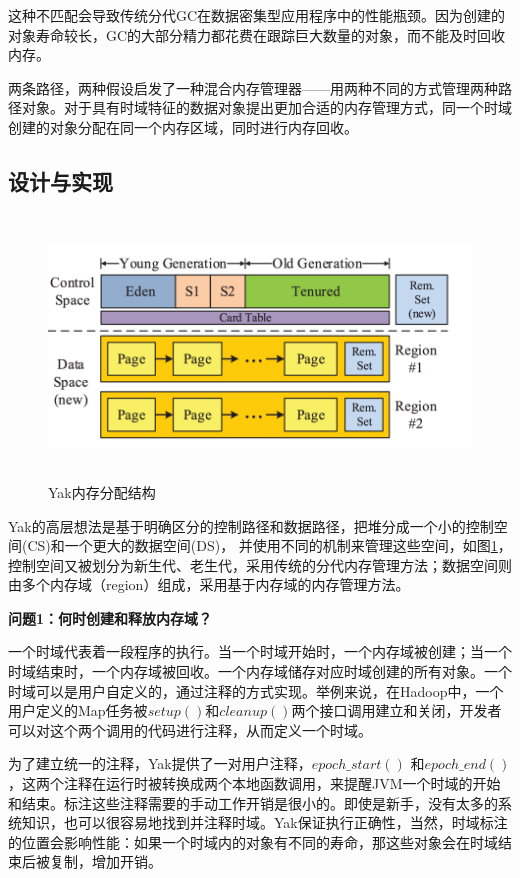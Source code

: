 这种不匹配会导致传统分代GC在数据密集型应用程序中的性能瓶颈。因为创建的对象寿命较长，GC的大部分精力都花费在跟踪巨大数量的对象，而不能及时回收内存。 

两条路径，两种假设启发了一种混合内存管理器——用两种不同的方式管理两种路径对象。对于具有时域特征的数据对象提出更加合适的内存管理方式，同一个时域创建的对象分配在同一个内存区域，同时进行内存回收。

\subsection{设计与实现}
\begin{figure}[h]
    \centering
    \includegraphics[width=12cm,height=7cm]{figure/layout.png}
    \caption{
       Yak内存分配结构
    }
    \label{img3}
\end{figure}

Yak的高层想法是基于明确区分的控制路径和数据路径，把堆分成一个小的控制空间(CS)和一个更大的数据空间(DS)， 并使用不同的机制来管理这些空间，如图\ref{img3}，控制空间又被划分为新生代、老生代，采用传统的分代内存管理方法；数据空间则由多个内存域（region）组成，采用基于内存域的内存管理方法。

{\bfseries 问题1：何时创建和释放内存域？}

一个时域代表着一段程序的执行。当一个时域开始时，一个内存域被创建；当一个时域结束时，一个内存域被回收。一个内存域储存对应时域创建的所有对象。一个时域可以是用户自定义的，通过注释的方式实现。举例来说，在Hadoop中，一个用户定义的Map任务被$setup()$和$cleanup()$两个接口调用建立和关闭，开发者可以对这个两个调用的代码进行注释，从而定义一个时域。

为了建立统一的注释，Yak提供了一对用户注释，$epoch\_start()$ 和$epoch\_end()$，这两个注释在运行时被转换成两个本地函数调用，来提醒JVM一个时域的开始和结束。标注这些注释需要的手动工作开销是很小的。即使是新手，没有太多的系统知识，也可以很容易地找到并注释时域。Yak保证执行正确性，当然，时域标注的位置会影响性能：如果一个时域内的对象有不同的寿命，那这些对象会在时域结束后被复制，增加开销。

